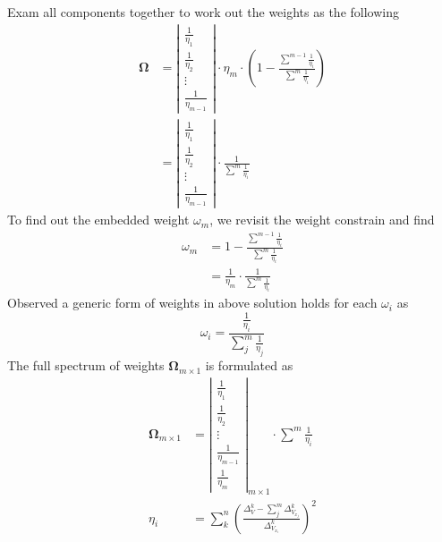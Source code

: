\documentclass{article}
\begin{document}
Exam all components together to work out the weights as the following
\begin{align}
    \boldsymbol{\Omega} &= \left| \begin{matrix} \frac{1}{\eta_1} \\ \frac{1}{\eta_2} \\ \vdots \\ \frac{1}{\eta_{m - 1}} \end{matrix} \right| \cdot \eta_m \cdot \left(1 - \frac{\sum^{m - 1}{\frac{1}{\eta_i}}}{\sum^{m}{\frac{1}{\eta_i}}} \right) \nonumber \\
    &= \left| \begin{matrix} \frac{1}{\eta_1} \\ \frac{1}{\eta_2} \\ \vdots \\ \frac{1}{\eta_{m - 1}} \end{matrix} \right| \cdot \frac{1}{\sum^{m}{\frac{1}{\eta_i}}}
\end{align}
To find out the embedded weight $ \omega_m $, we revisit the weight constrain and find
\begin{align}
    \omega_m &= 1 - \frac{\sum^{m - 1}{\frac{1}{\eta_i}}}{\sum^{m}{\frac{1}{\eta_i}}} \nonumber \\
    &= \frac{1}{\eta_m} \cdot \frac{1}{\sum^m{\frac{1}{\eta_i}}}
\end{align}
Observed a generic form of weights in above solution holds for each $ \omega_i $ as
\begin{equation}
    \omega_i = \frac{\frac{1}{\eta_i}}{\sum_{j}^{m}{\frac{1}{\eta_j}}}
\end{equation}
The full spectrum of weights $ \boldsymbol{\Omega}_{m \times 1} $ is formulated as
\begin{subequations}
    \begin{align}
        \boldsymbol{\Omega}_{m \times 1} &= \left| \begin{matrix} \frac{1}{\eta_1} \\ \frac{1}{\eta_2} \\ \vdots \\ \frac{1}{\eta_{m - 1}} \\ \frac{1}{\eta_m} \end{matrix} \right|_{m \times 1} \cdot \sum^m{\frac{1}{\eta_i}} \\
        \eta_i &= \sum_{k}^{n}{\left(\frac{\Delta_V^k - \sum_j^m{\Delta_{V_{x_j}}^{k}}}{\Delta_{V_{x_i}}^{k}}\right)^2}
    \end{align}
\end{subequations}
\end{document}
